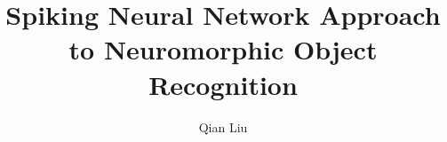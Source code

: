 \documentclass[12pt,PhD,twoside]{muthesis}
\begin{document}

\title{Spiking Neural Network Approach to Neuromorphic Object Recognition} %
\author{Qian Liu}

\beforeabstract



{}













%

\end{document}

